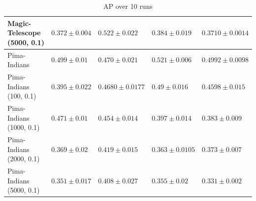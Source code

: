 \begin{table}[ht!]
\begin{tabular}{lllll}
				Magic-Telescope (5000, 0.1) & $0.372 \pm 0.004$  & $ 0.522 \pm 0.022$ & $0.384 \pm 0.019$ & $ 0.3710 \pm 0.0014$	\\
				\midrule
				Pima-Indians & $0.499 \pm 0.01$ & $0.470 \pm 0.021$ & $0.521 \pm 0.006$ & $0.4992 \pm 0.0098$\\
				Pima-Indians (100, 0.1) & $0.395 \pm 0.022$ & $0.4680 \pm 0.0177$ & $0.49 \pm 0.016$ & $0.4598 \pm 0.015$	\\
				Pima-Indians (1000, 0.1) & $0.471 \pm 0.01$ & $0.454 \pm 0.014$ & $0.397 \pm 0.014$ & $0.383 \pm 0.009$	\\
				Pima-Indians (2000, 0.1) & $0.369 \pm 0.02$ &  $0.419 \pm 0.015$ & $0.363 \pm 0.0105$ & $0.373 \pm 0.007$	\\
				Pima-Indians (5000, 0.1) & $0.351 \pm 0.017$  & $0.408 \pm 0.027$ & $0.355 \pm 0.02$ & $0.331 \pm 0.002$	\\
				\bottomrule
		\end{tabular}
		\caption{AP over 10 runs}
\end{table}
